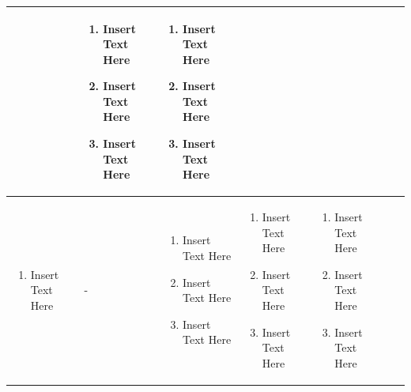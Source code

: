 \documentclass [10pt]{article}
\begin{document}
\begin{longtable}{| p{ } | p{ } | p{ } |p{ } | p{ } | p{ } | p{ }| }
&
\begin{minipage}{\columnwidth}
\vspace{2mm}
\begin{enumerate}
\item Insert Text Here
\item Insert Text Here
\item Insert Text Here
\end{enumerate}
\end{minipage}
& 

\begin{minipage}{\columnwidth}
\vspace{2mm}
\begin{enumerate}
\item Insert Text Here
\item Insert Text Here
\item Insert Text Here
\end{enumerate}
\end{minipage}\\ \hline 


\rowcolor{tableCell}\begin{minipage}{\columnwidth}
\begin{enumerate}
\item Insert Text Here

\end{enumerate}
\end{minipage}
& 

-
& 
\begin{minipage}{\columnwidth}
\vspace{2mm}
\begin{enumerate}
\item Insert Text Here
\item Insert Text Here
\item Insert Text Here
\end{enumerate}
\end{minipage}

&
\begin{minipage}{\columnwidth}
\vspace{2mm}
\begin{enumerate}
\item Insert Text Here
\item Insert Text Here
\item Insert Text Here
\end{enumerate}
\end{minipage}


& 
\begin{minipage}{\columnwidth}
\vspace{2mm}
\begin{enumerate}
\item Insert Text Here
\item Insert Text Here
\item Insert Text Here
\end{enumerate}
\end{minipage}


\end{longtable}
\end{document}
